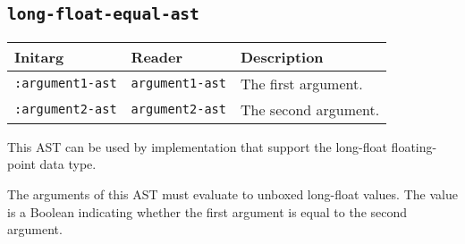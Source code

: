 \subsection{\texttt{long-float-equal-ast}}
\label{sec-ast-long-float-equal}

\begin{tabular}{|l|l|l|}
\hline
Initarg & Reader & Description\\
\hline\hline
\texttt{:argument1-ast} & \texttt{argument1-ast} & The first argument.\\
\hline
\texttt{:argument2-ast} & \texttt{argument2-ast} & The second argument.\\
\hline
\end{tabular}

This AST can be used by implementation that support the long-float
floating-point data type.  

The arguments of this AST must evaluate to unboxed long-float
values.  The value is a Boolean indicating whether the first argument
is equal to the second argument.
